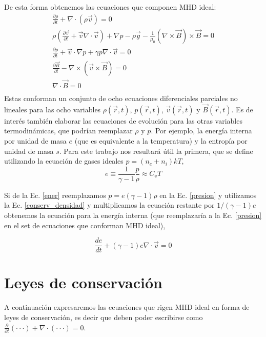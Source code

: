 \documentclass[a4paper,11pt]{report}
\begin{document}
De esta forma obtenemos las ecuaciones que componen MHD ideal:
\begin{eqnarray}
\frac{\partial \rho}{\partial t} +\nabla \cdot (\rho \vec{v}) = 0 \label{conserv_densidad} \\
\rho \left( \frac{\partial\vec{v}}{\partial t} + \vec{v} \nabla \cdot \vec{v}\right) +\nabla p - \rho \vec{g} -\frac{1}{\mu_0}(\nabla \times \vec{B}) \times \vec{B} =0 \label{mhd_momento} \\
\frac{\partial p}{\partial t} + \vec{v} \cdot \nabla p + \gamma p \nabla \cdot \vec{v} = 0 \label{presion}\\
\frac{\partial \vec{B}}{\partial t} - \nabla \times (\vec{v} \times \vec{B}) = 0 \label{mhd_B} \\
\nabla \cdot \vec{B} = 0 \\
\end{eqnarray}
Estas conforman un conjunto de ocho ecuaciones diferenciales parciales no lineales para las ocho variables $\rho(\vec{r},t)$, $p(\vec{r},t)$, $\vec{v}(\vec{r},t)$ y $\vec{B}(\vec{r},t)$. Es de interés también elaborar las ecuaciones de evolución para las otras variables termodinámicas, que podrían reemplazar $\rho$ y $p$. Por ejemplo, la energía interna por unidad de masa $e$ (que es equivalente a la temperatura) y la entropía por unidad de masa $s$. Para este trabajo nos resultará útil la primera, que se define utilizando la ecuación de gases ideales $p = (n_e +n_i)kT$,
\begin{equation}
e \equiv \frac{1}{\gamma -1 } \frac{p}{\rho} \approx C_v T \label{ener}
\end{equation}

Si de la Ec. \ref{ener} reemplazamos $p=e (\gamma -1)\rho$ en la Ec. \ref{presion} y utilizamos la Ec. \ref{conserv_densidad} y multiplicamos la ecuación restante por $1/(\gamma -1)e$ obtenemos la ecuación para la energía interna (que reemplazaría a la Ec. \ref{presion} en el set de ecuaciones que conforman MHD ideal),

\begin{equation}
\frac{de}{dt} + (\gamma -1)e\nabla \cdot \vec{v} =0 \label{conserv_ener}
\end{equation}




\section{Leyes de conservación}\label{leyes_conserv}
A continuación expresaremos las ecuaciones que rigen MHD ideal en forma de leyes de conservación, es decir que deben poder escribirse como $\frac{\partial}{\partial t}(\cdot \cdot \cdot) +\nabla \cdot (\cdot \cdot \cdot) =0$.
\end{document}
